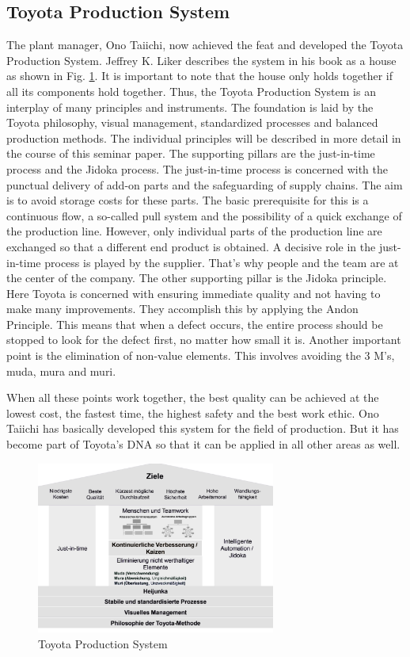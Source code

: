 \documentclass[a4paper,12pt]{scrartcl}
\begin{document}
    
    
    
\subsection{Toyota Production System}
    
    The plant manager, Ono Taiichi, now achieved the feat and developed the Toyota Production System. Jeffrey K. Liker describes the system in his book as a house as shown in Fig. \ref{TPS}. It is important to note that the house only holds together if all its components hold together. Thus, the Toyota Production System is an interplay of many principles and instruments. The foundation is laid by the Toyota philosophy, visual management, standardized processes and balanced production methods. The individual principles will be described in more detail in the course of this seminar paper. The supporting pillars are the just-in-time process and the Jidoka process. The just-in-time process is concerned with the punctual delivery of add-on parts and the safeguarding of supply chains. The aim is to avoid storage costs for these parts. The basic prerequisite for this is a continuous flow, a so-called pull system and the possibility of a quick exchange of the production line. However, only individual parts of the production line are exchanged so that a different end product is obtained. A decisive role in the just-in-time process is played by the supplier. That's why people and the team are at the center of the company. The other supporting pillar is the Jidoka principle. Here Toyota is concerned with ensuring immediate quality and not having to make many improvements. They accomplish this by applying the Andon Principle. This means that when a defect occurs, the entire process should be stopped to look for the defect first, no matter how small it is. Another important point is the elimination of non-value elements. This involves avoiding the 3 M's, muda, mura and muri. 
    
    When all these points work together, the best quality can be achieved at the lowest cost, the fastest time, the highest safety and the best work ethic. Ono Taiichi has basically developed this system for the field of production. But it has become part of Toyota's DNA so that it can be applied in all other areas as well.


\begin{figure}[h] 
  \centering
     \includegraphics[width=0.7\textwidth]{TPS.png}
  \caption{Toyota Production System}
  \label{TPS}
\end{figure}
\end{document}
